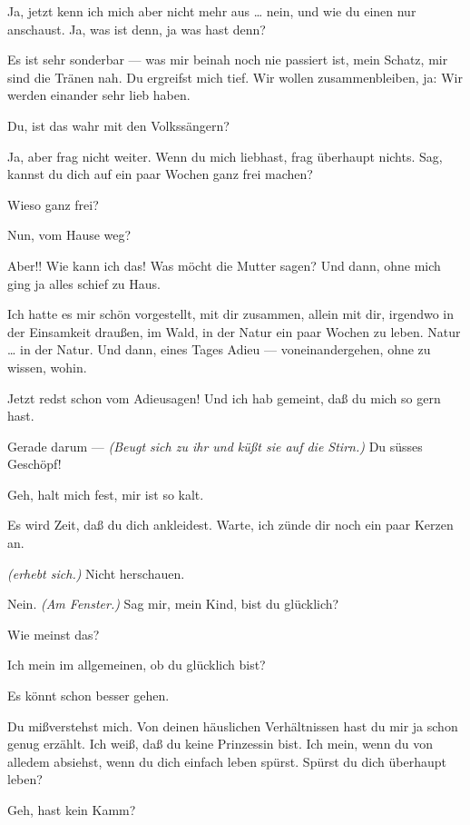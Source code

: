 \documentclass[
	final,
	a4paper,
	ngerman,
	mpinclude = true, %
	twoside = true,
	open = right,
	cleardoublepage = plain,
	DIV = 13,
	BCOR = 1cm,
	titlepage = firstiscover,
	]{scrbook}
\newcommand{\direction}[1]{\textit{(#1)}}
\newcommand{\thecharacter}[1]{\textup{\textsc{#1}}}
\newcommand{\thesuesse}{\thecharacter{Süßes Mädel}}
\newcommand{\thedichter}{\thecharacter{Dichter}}
\newcommand{\character}[1]{\item[#1:]}
\newcommand{\suesse}{\character{\thesuesse}}
\newcommand{\dichter}{\character{\thedichter}}
\begin{document}
\begin{play}
	\suesse
	Ja, jetzt kenn ich mich aber nicht mehr aus \ldots{} nein, und wie du einen nur anschaust. Ja, was ist denn, ja was hast denn?

	\dichter
	Es ist sehr sonderbar --- was mir beinah noch nie passiert ist, mein Schatz, mir sind die Tränen nah. Du ergreifst mich tief. Wir wollen zusammenbleiben, ja: Wir werden einander sehr lieb haben.

	\suesse
	Du, ist das wahr mit den Volkssängern?

	\dichter
	Ja, aber frag nicht weiter. Wenn du mich liebhast, frag überhaupt nichts. Sag, kannst du dich auf ein paar Wochen ganz frei machen?

	\suesse
	Wieso ganz frei?

	\dichter
	Nun, vom Hause weg?

	\suesse
	Aber!! Wie kann ich das! Was möcht die Mutter sagen? Und dann, ohne mich ging ja alles schief zu Haus.

	\dichter
	Ich hatte es mir schön vorgestellt, mit dir zusammen, allein mit dir, irgendwo in der Einsamkeit draußen, im Wald, in der Natur ein paar Wochen zu leben. Natur \ldots{} in der Natur. Und dann, eines Tages Adieu --- voneinandergehen, ohne zu wissen, wohin.

	\suesse
	Jetzt redst schon vom Adieusagen! Und ich hab gemeint, daß du mich so gern hast.

	\dichter
	Gerade darum --- \direction{Beugt sich zu ihr und küßt sie auf die Stirn.} Du süsses Geschöpf!

	\suesse
	Geh, halt mich fest, mir ist so kalt.

	\dichter
	Es wird Zeit, daß du dich ankleidest. Warte, ich zünde dir noch ein paar Kerzen an.

	\suesse
	\direction{erhebt sich.} Nicht herschauen.

	\dichter
	Nein. \direction{Am Fenster.} Sag mir, mein Kind, bist du glücklich?

	\suesse
	Wie meinst das?

	\dichter
	Ich mein im allgemeinen, ob du glücklich bist?

	\suesse
	Es könnt schon besser gehen.

	\dichter
	Du mißverstehst mich. Von deinen häuslichen Verhältnissen hast du mir ja schon genug erzählt. Ich weiß, daß du keine Prinzessin bist. Ich mein, wenn du von alledem absiehst, wenn du dich einfach leben spürst. Spürst du dich überhaupt leben?

	\suesse
	Geh, hast kein Kamm?


\end{play}
\end{document}
